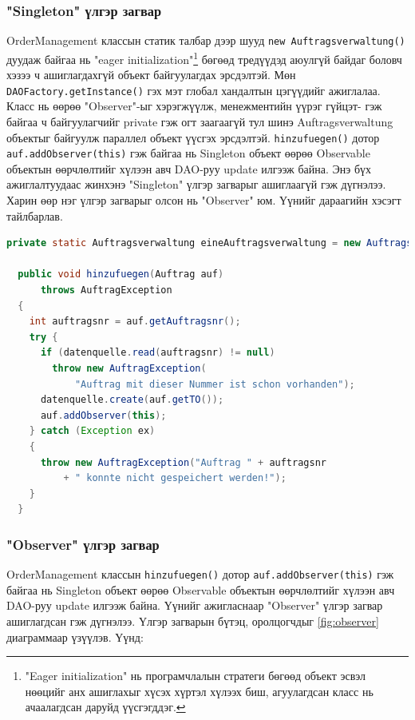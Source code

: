 \subsubsection{"Singleton" үлгэр загвар}
OrderManagement классын статик талбар дээр шууд \verb|new Auftragsverwaltung()| дуудаж байгаа нь "eager initialization"\footnote{"Eager initialization" нь програмчлалын стратеги бөгөөд объект эсвэл нөөцийг анх ашиглахыг хүсэх хүртэл хүлээх биш, агуулагдсан класс нь ачаалагдсан даруйд үүсгэгддэг.} бөгөөд тредүүдэд аюулгүй байдаг боловч хэзээ ч ашиглагдахгүй объект байгуулагдах эрсдэлтэй. Мөн \verb|DAOFactory.getInstance()| гэх мэт глобал хандалтын цэгүүдийг ажиглалаа.   Класс нь өөрөө "Observer"-ыг хэрэгжүүлж, менежментийн үүрэг гүйцэт- гэж байгаа ч байгуулагчийг private гэж огт заагаагүй тул шинэ Auftragsverwaltung объектыг байгуулж параллел объект үүсгэх эрсдэлтэй. \verb|hinzufuegen()| дотор \verb|auf.addObserver(this)| гэж байгаа нь Singleton объект өөрөө Observable объектын өөрчлөлтийг хүлээн авч DAO-руу update илгээж байна. Энэ бүх ажиглалтуудаас жинхэнэ "Singleton" үлгэр загварыг ашиглаагүй гэж дүгнэлээ. Харин өөр нэг үлгэр загварыг олсон нь "Observer" юм. Үүнийг дараагийн хэсэгт тайлбарлав.
\begin{lstlisting}[language=Java, caption=OrderManagement классын арга hinzufuegen, frame=single]
  private static Auftragsverwaltung eineAuftragsverwaltung = new Auftragsverwaltung();

  public void hinzufuegen(Auftrag auf)
      throws AuftragException
  {
    int auftragsnr = auf.getAuftragsnr();
    try {
      if (datenquelle.read(auftragsnr) != null)
        throw new AuftragException(
            "Auftrag mit dieser Nummer ist schon vorhanden");
      datenquelle.create(auf.getTO());
      auf.addObserver(this);
    } catch (Exception ex)
    {
      throw new AuftragException("Auftrag " + auftragsnr
          + " konnte nicht gespeichert werden!");
    }
  }
\end{lstlisting}

\subsubsection{"Observer" үлгэр загвар}

OrderManagement классын \verb|hinzufuegen()| дотор \verb|auf.addObserver(this)| гэж байгаа нь Singleton объект өөрөө Observable объектын өөрчлөлтийг хүлээн авч DAO-руу update илгээж байна. Үүнийг ажигласнаар "Observer" үлгэр загвар ашиглагдсан гэж дүгнэлээ. Үлгэр загварын бүтэц, оролцогчдыг \ref{fig:observer} диаграммаар үзүүлэв. Үүнд:

